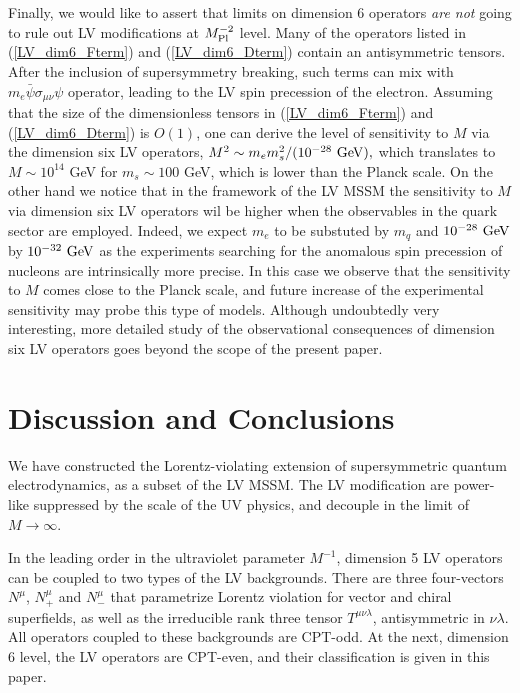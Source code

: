 \documentclass[12pt]{revtex4}
\begin{document}
Finally, we would like to assert that limits on dimension 6 operators 
{\em are not} going to rule out LV modifications at $M^{-2}_{\rm Pl}$ level. 
Many of the operators listed in (\ref{LV_dim6_Fterm}) and (\ref{LV_dim6_Dterm})
contain an antisymmetric tensors.  After the inclusion of supersymmetry breaking, 
such terms can mix with $m_e\bar \psi \sigma_{\mu\nu} \psi$ operator, leading to 
the LV spin precession of the electron. Assuming that the size of the dimensionless 
tensors in (\ref{LV_dim6_Fterm}) and (\ref{LV_dim6_Dterm}) is $O(1)$, one can 
derive the level of sensitivity to $M$ via the dimension six LV operators,
$
M^2 \sim m_em_s^2/(10^{-28}~{\rm GeV}), 
$
which translates to $M \sim 10^{14}$ GeV for $m_s \sim 100$ GeV, which is 
lower than the Planck scale. On the other hand we notice that in the 
framework of the LV MSSM the sensitivity to $M$ via dimension six LV operators 
wil be higher when the observables in the quark sector are employed. Indeed, 
we expect $m_e$ to be substuted by $m_q$ and $10^{-28}~{\rm GeV}$ 
by $10^{-32}~{\rm GeV}$ as the experiments searching for the anomalous 
spin precession of nucleons are intrinsically more precise. 
In this case we observe that the sensitivity to $M$  comes close to
the Planck scale, and future increase of the experimental sensitivity 
may probe this type of models. Although undoubtedly very interesting,
more detailed study of the observational consequences of 
dimension six LV operators goes beyond the scope of the present paper. 



\section{Discussion and Conclusions}

We have constructed the Lorentz-violating extension of supersymmetric quantum electrodynamics,
as a subset of the LV MSSM. The LV modification are power-like 
suppressed by the scale of the UV physics,
and decouple in the limit of $M\to \infty$. 

In the leading order in the ultraviolet parameter $M^{-1}$, 
dimension 5 LV operators can be coupled to
two types of the LV backgrounds. There are three four-vectors 
$N^\mu$, $N^\mu_+$ and $N^{\mu}_-$
that parametrize Lorentz violation for vector and chiral superfields, 
as well as the irreducible rank three tensor $T^{\mu\nu\lambda}$, 
antisymmetric in $\nu\lambda$. All operators coupled to these 
backgrounds are CPT-odd. At the next, dimension 6 level, the
LV operators are CPT-even, and their classification is given in 
this paper. 
\end{document}
